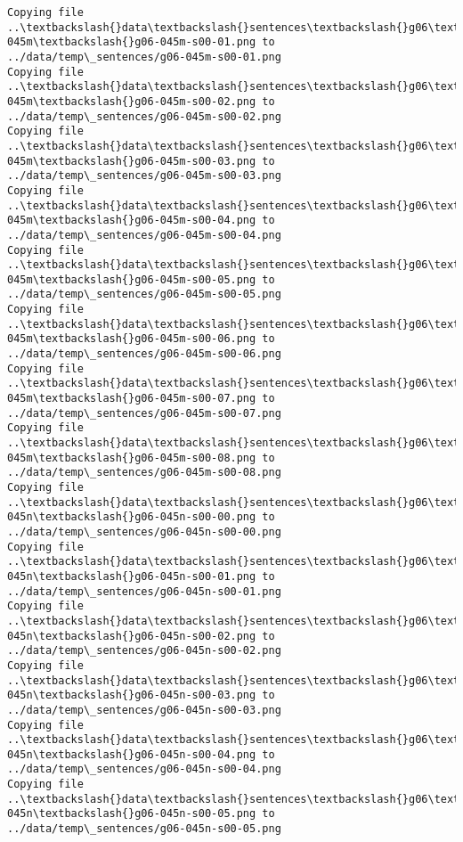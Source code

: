 \documentclass[11pt]{article}
\begin{document}
\begin{Verbatim}[commandchars=\\\{\}]
Copying file ..\textbackslash{}data\textbackslash{}sentences\textbackslash{}g06\textbackslash{}g06-045m\textbackslash{}g06-045m-s00-01.png to
../data/temp\_sentences/g06-045m-s00-01.png
Copying file ..\textbackslash{}data\textbackslash{}sentences\textbackslash{}g06\textbackslash{}g06-045m\textbackslash{}g06-045m-s00-02.png to
../data/temp\_sentences/g06-045m-s00-02.png
Copying file ..\textbackslash{}data\textbackslash{}sentences\textbackslash{}g06\textbackslash{}g06-045m\textbackslash{}g06-045m-s00-03.png to
../data/temp\_sentences/g06-045m-s00-03.png
Copying file ..\textbackslash{}data\textbackslash{}sentences\textbackslash{}g06\textbackslash{}g06-045m\textbackslash{}g06-045m-s00-04.png to
../data/temp\_sentences/g06-045m-s00-04.png
Copying file ..\textbackslash{}data\textbackslash{}sentences\textbackslash{}g06\textbackslash{}g06-045m\textbackslash{}g06-045m-s00-05.png to
../data/temp\_sentences/g06-045m-s00-05.png
Copying file ..\textbackslash{}data\textbackslash{}sentences\textbackslash{}g06\textbackslash{}g06-045m\textbackslash{}g06-045m-s00-06.png to
../data/temp\_sentences/g06-045m-s00-06.png
Copying file ..\textbackslash{}data\textbackslash{}sentences\textbackslash{}g06\textbackslash{}g06-045m\textbackslash{}g06-045m-s00-07.png to
../data/temp\_sentences/g06-045m-s00-07.png
Copying file ..\textbackslash{}data\textbackslash{}sentences\textbackslash{}g06\textbackslash{}g06-045m\textbackslash{}g06-045m-s00-08.png to
../data/temp\_sentences/g06-045m-s00-08.png
Copying file ..\textbackslash{}data\textbackslash{}sentences\textbackslash{}g06\textbackslash{}g06-045n\textbackslash{}g06-045n-s00-00.png to
../data/temp\_sentences/g06-045n-s00-00.png
Copying file ..\textbackslash{}data\textbackslash{}sentences\textbackslash{}g06\textbackslash{}g06-045n\textbackslash{}g06-045n-s00-01.png to
../data/temp\_sentences/g06-045n-s00-01.png
Copying file ..\textbackslash{}data\textbackslash{}sentences\textbackslash{}g06\textbackslash{}g06-045n\textbackslash{}g06-045n-s00-02.png to
../data/temp\_sentences/g06-045n-s00-02.png
Copying file ..\textbackslash{}data\textbackslash{}sentences\textbackslash{}g06\textbackslash{}g06-045n\textbackslash{}g06-045n-s00-03.png to
../data/temp\_sentences/g06-045n-s00-03.png
Copying file ..\textbackslash{}data\textbackslash{}sentences\textbackslash{}g06\textbackslash{}g06-045n\textbackslash{}g06-045n-s00-04.png to
../data/temp\_sentences/g06-045n-s00-04.png
Copying file ..\textbackslash{}data\textbackslash{}sentences\textbackslash{}g06\textbackslash{}g06-045n\textbackslash{}g06-045n-s00-05.png to
../data/temp\_sentences/g06-045n-s00-05.png

\end{Verbatim}
\end{document}

